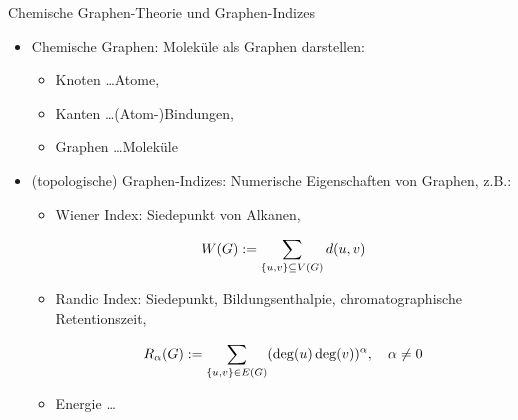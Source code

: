 \documentclass[aspectratio = 169]{beamer}
\begin{document}

\begin{frame}{Chemische Graphen-Theorie und Graphen-Indizes}

    \begin{block}{}

        \begin{itemize}

            \item Chemische Graphen: Moleküle als Graphen darstellen:
            
            \begin{itemize}
                \item Knoten  \dots Atome,
                \item Kanten  \dots (Atom-)Bindungen,
                \item Graphen \dots Moleküle
            \end{itemize}

            \item (topologische) Graphen-Indizes: Numerische Eigenschaften von Graphen, z.B.:

            \begin{itemize}
    
                \item Wiener Index: Siedepunkt von Alkanen,

                \[
                    W(G) := \sum_{{\left \{ u, v \right \}} \subseteq V(G)} d(u, v)
                \]

                \item Randic Index: Siedepunkt, Bildungsenthalpie, chromatographische Retentionszeit,


                \[
                    R_\alpha(G) := \sum_{{\left \{ u, v \right \}} \in E(G)} (\deg(u) \deg(v))^\alpha,
                    \quad
                    \alpha \neq 0
                \]

                \item Energie \dots



            \end{itemize}

        \end{itemize}

    \end{block}

\end{frame}
\end{document}
